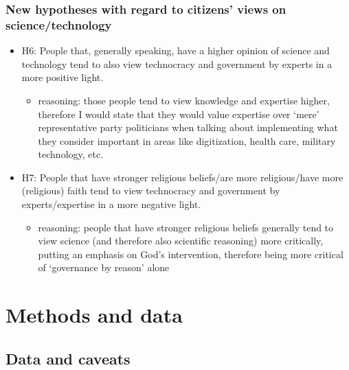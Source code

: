 \documentclass[
  12pt,
  english,
]{article}
\providecommand{\tightlist}{%
  \setlength{\itemsep}{0pt}\setlength{\parskip}{0pt}}
\begin{document}
\hypertarget{new-hypotheses-with-regard-to-citizens-views-on-sciencetechnology}{%
\subsubsection{New hypotheses with regard to citizens' views on
science/technology}\label{new-hypotheses-with-regard-to-citizens-views-on-sciencetechnology}}

\begin{itemize}
\tightlist
\item
  H6: People that, generally speaking, have a higher opinion of science
  and technology tend to also view technocracy and government by experts
  in a more positive light.

  \begin{itemize}
  \tightlist
  \item
    reasoning: those people tend to view knowledge and expertise higher,
    therefore I would state that they would value expertise over `mere'
    representative party politicians when talking about implementing
    what they consider important in areas like digitization, health
    care, military technology, etc.
  \end{itemize}
\item
  H7: People that have stronger religious beliefs/are more
  religious/have more (religious) faith tend to view technocracy and
  government by experts/expertise in a more negative light.

  \begin{itemize}
  \tightlist
  \item
    reasoning: people that have stronger religious beliefs generally
    tend to view science (and therefore also scientific reasoning) more
    critically, putting an emphasis on God's intervention, therefore
    being more critical of `governance by reason' alone
  \end{itemize}
\end{itemize}

\hypertarget{methods-and-data}{%
\section{Methods and data}\label{methods-and-data}}

\hypertarget{data-and-caveats}{%
\subsection{Data and caveats}\label{data-and-caveats}}
\end{document}

